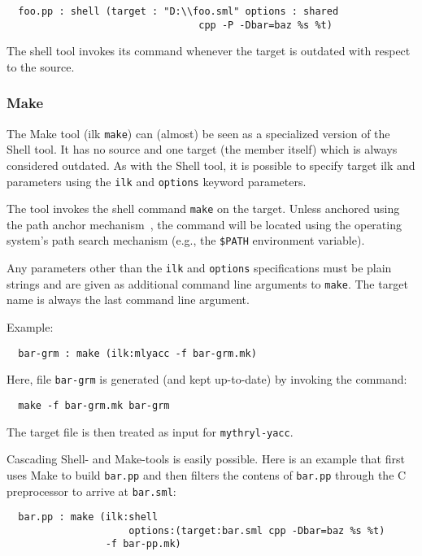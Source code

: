 \begin{verbatim}
  foo.pp : shell (target : "D:\\foo.sml" options : shared
                                 cpp -P -Dbar=baz %s %t)
\end{verbatim}

The shell tool invokes its command whenever the target is outdated
with respect to the source.

\subsubsection{Make}

The Make tool (ilk {\tt make}) can (almost) be seen as a specialized
version of the Shell tool.  It has no source and one target (the
member itself) which is always considered outdated.  As with the Shell
tool, it is possible to specify target ilk and parameters using the
{\tt ilk} and {\tt options} keyword parameters.

The tool invokes the shell command {\tt make} on the target.  Unless
anchored using the path anchor mechanism~, the
command will be located using the operating system's path search
mechanism (e.g., the {\tt \$PATH} environment variable).

Any parameters other than the {\tt ilk} and {\tt options}
specifications must be plain strings and are given as additional
command line arguments to {\tt make}.  The target name is always the
last command line argument.

Example:

\begin{verbatim}
  bar-grm : make (ilk:mlyacc -f bar-grm.mk)
\end{verbatim}

Here, file {\tt bar-grm} is generated (and kept up-to-date) by
invoking the command:
\begin{verbatim}
  make -f bar-grm.mk bar-grm
\end{verbatim}
\noindent The target file is then treated as input for {\tt mythryl-yacc}.

Cascading Shell- and Make-tools is easily possible.  Here is an
example that first uses Make to build {\tt bar.pp} and then filters
the contens of {\tt bar.pp} through the C preprocessor to arrive at
{\tt bar.sml}:

\begin{verbatim}
  bar.pp : make (ilk:shell
                     options:(target:bar.sml cpp -Dbar=baz %s %t)
                 -f bar-pp.mk)
\end{verbatim}

